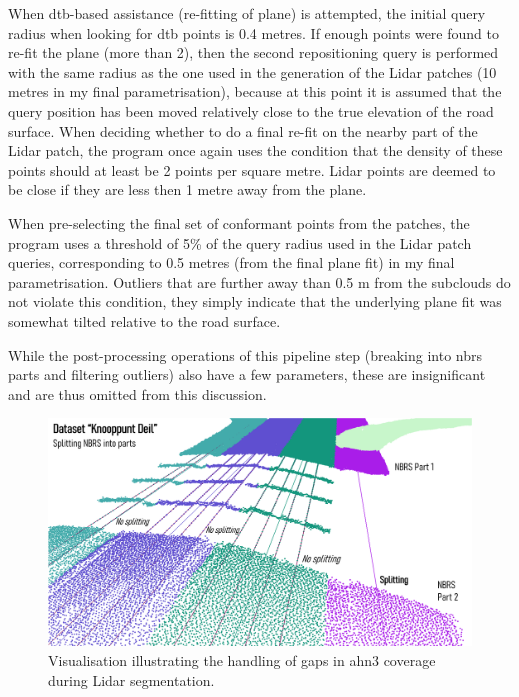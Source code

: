 When \ac{dtb}-based assistance (re-fitting of plane) is attempted, the initial query radius when looking for \ac{dtb} points is 0.4 metres. If enough points were found to re-fit the plane (more than 2), then the second repositioning query is performed with the same radius as the one used in the generation of the Lidar patches (10 metres in my final parametrisation), because at this point it is assumed that the query position has been moved relatively close to the true elevation of the road surface. When deciding whether to do a final re-fit on the nearby part of the Lidar patch, the program once again uses the condition that the density of these points should at least be 2 points per square metre. Lidar points are deemed to be close if they are less then 1 metre away from the plane.

When pre-selecting the final set of conformant points from the patches, the program uses a threshold of 5\% of the query radius used in the Lidar patch queries, corresponding to 0.5 metres (from the final plane fit) in my final parametrisation. Outliers that are further away than 0.5 m from the subclouds do not violate this condition, they simply indicate that the underlying plane fit was somewhat tilted relative to the road surface.

While the post-processing operations of this pipeline step (breaking into \ac{nbrs} parts and filtering outliers) also have a few parameters, these are insignificant and are thus omitted from this discussion.

\begin{figure}
    \centering
    \includegraphics[width=0.92\linewidth]{final_report/figs/lidarsegmentation2.png}
    \caption{Visualisation illustrating the handling of gaps in \ac{ahn3} coverage during Lidar segmentation.}
    \label{fig:lidarsegmentation2}
\end{figure}

